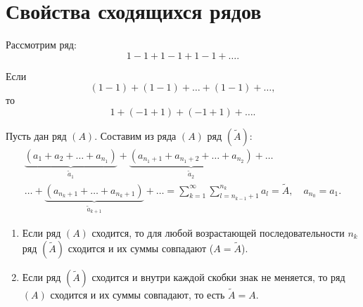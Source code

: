 

\section{Свойства сходящихся рядов}

\begin{note}
    Рассмотрим ряд:
    \[
        1-1+1-1+1-1+\ldots.
    \]

    Если
    \[
        (1-1) + (1-1) + \ldots + (1-1) + \ldots,
    \]
    то
    \[
        1 + (-1 + 1) + (-1 + 1) + \ldots.
    \]

    Пусть дан ряд $ (A) $. Составим из ряда $(A)$ ряд $(\widetilde{A})$:
    \begin{multline*}
        \underbrace{(a_1 + a_2 + \ldots + a_{n_1})}_{\widetilde{a}_1} + \underbrace{(a_{n_1 + 1} + a_{n_1 + 2} + \ldots + a_{n_2})}_{\widetilde{a}_2} + \ldots \\
        \ldots + \underbrace{(a_{n_k + 1} + \ldots + a_{n_k + 1})}_{\widetilde{a}_{k+1}} + \ldots = \sum_{k=1}^{\infty}\sum_{l=n_{k-1}+1}^{n_k} a_l = \widetilde{A}, \quad a_{n_0} = a_1.
    \end{multline*}
\end{note}

\begin{theorem}\leavevmode
    \begin{enumerate}
        \item Если ряд $(A)$ сходится, то для любой возрастающей последовательности $n_k$ ряд $(\widetilde{A})$ сходится и их суммы совпадают ($A = \widetilde{A}$).
        \item Если ряд $(\widetilde{A})$ сходится и внутри каждой  скобки знак не меняется, то ряд $(A)$ сходится и их суммы совпадают, то есть $\widetilde{A} = A$.
    \end{enumerate}
\end{theorem}

